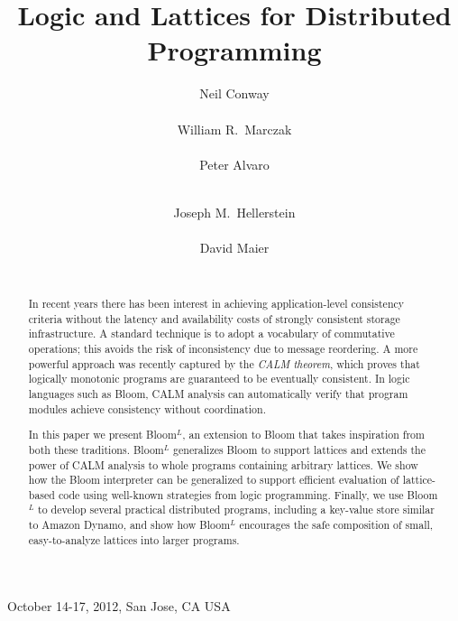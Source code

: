\documentclass{sig-alternate}
\def\lang{Bloom$^L$\xspace}
\def\mytitle{Logic and Lattices for Distributed Programming}
\begin{document}
 {October 14-17, 2012, San Jose, CA USA} 

\title{\mytitle}


\author{
\alignauthor
Neil Conway\\
       \\
\alignauthor
William R.\ Marczak\\
       \\
\alignauthor
Peter Alvaro\\
       \\
\and
\alignauthor
Joseph M.\ Hellerstein\\
       \\
\alignauthor
David Maier\\
       \\
}

\maketitle

\begin{abstract}
  In recent years there has been interest in achieving application-level
  consistency criteria without the latency and availability costs of strongly
  consistent storage infrastructure. A standard technique
  is to adopt a vocabulary of
  commutative operations; this avoids the risk of inconsistency due to message
  reordering.  A more powerful approach was recently captured by the \emph{CALM
    theorem}, which proves that logically monotonic programs are guaranteed to
  be eventually consistent. 
  In logic languages such as Bloom, CALM analysis can automatically verify that program modules achieve consistency without coordination.

  In this paper we present \lang, an extension to Bloom that takes inspiration
  from both these traditions.  
  \lang generalizes Bloom to support lattices
  and extends the power of CALM analysis to whole programs containing arbitrary
  lattices. We show how the Bloom interpreter can be generalized to support
  efficient evaluation of lattice-based code using well-known strategies from
  logic programming.  Finally, we use \lang to develop several practical
  distributed programs, including a key-value store similar to Amazon Dynamo,
  and show how \lang encourages the safe composition of small, easy-to-analyze
  lattices into larger programs.
\end{abstract}
\end{document}
